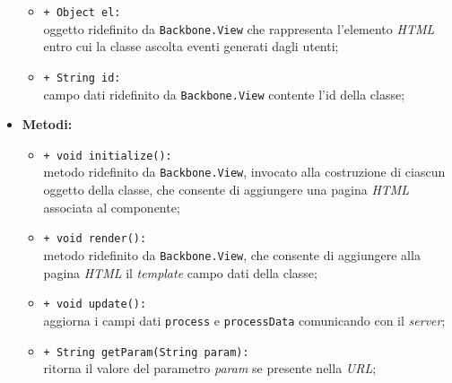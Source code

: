\begin{flushleft}
\begin{itemize}
\begin{sloppypar}
\begin{itemize}
\item \texttt{+ Object el:}\\ oggetto ridefinito da \texttt{Backbone.View} che rappresenta l'elemento \textit{HTML} entro cui la classe ascolta eventi generati dagli utenti;
\item \texttt{+ String id:}\\ campo dati ridefinito da \texttt{Backbone.View} contente l'id della classe;
\end{itemize}
\end{sloppypar}
\item \textbf{Metodi:}
\begin{sloppypar}
\begin{itemize}
\item \texttt{+ void initialize():}\\ metodo ridefinito da \texttt{Backbone.View}, invocato alla costruzione di ciascun oggetto della classe, che consente di aggiungere una pagina \textit{HTML} associata al componente;
\item \texttt{+ void render():}\\ metodo ridefinito da \texttt{Backbone.View}, che consente di aggiungere alla pagina \textit{HTML} il \textit{template} campo dati della classe;
\item \texttt{+ void update():}\\ aggiorna i campi dati \texttt{process} e \texttt{processData} comunicando con il \textit{server};
\item \texttt{+ String getParam(String param):}\\ ritorna il valore del parametro \textit{param} se presente nella \textit{URL};
\end{itemize}
\end{sloppypar}
\end{itemize}
\end{flushleft}

